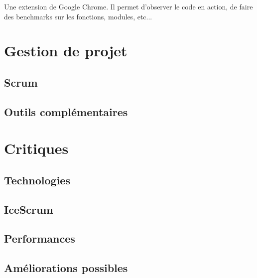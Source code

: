 \documentclass [a4paper,11pt]{article}
\begin{document}
Une extension de Google Chrome. Il permet d'observer le code en action, de faire des benchmarks sur les fonctions, modules, etc...

\newpage
\section{Gestion de projet}

\subsection{Scrum}

\subsection{Outils complémentaires}

\newpage

\newpage

\section{Critiques}

\subsection{Technologies}

\subsection{IceScrum}

\subsection{Performances}

\subsection{Améliorations possibles}

\newpage

\nocite{*}


\end{document}
